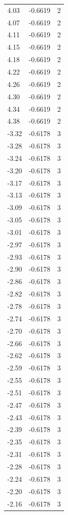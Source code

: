 \begin{longtable}{lrr}
  4.03 & -0.6619 & 2 \\
  4.07 & -0.6619 & 2 \\
  4.11 & -0.6619 & 2 \\
  4.15 & -0.6619 & 2 \\
  4.18 & -0.6619 & 2 \\
  4.22 & -0.6619 & 2 \\
  4.26 & -0.6619 & 2 \\
  4.30 & -0.6619 & 2 \\
  4.34 & -0.6619 & 2 \\
  4.38 & -0.6619 & 2 \\
  -3.32 & -0.6178 & 3 \\
  -3.28 & -0.6178 & 3 \\
  -3.24 & -0.6178 & 3 \\
  -3.20 & -0.6178 & 3 \\
  -3.17 & -0.6178 & 3 \\
  -3.13 & -0.6178 & 3 \\
  -3.09 & -0.6178 & 3 \\
  -3.05 & -0.6178 & 3 \\
  -3.01 & -0.6178 & 3 \\
  -2.97 & -0.6178 & 3 \\
  -2.93 & -0.6178 & 3 \\
  -2.90 & -0.6178 & 3 \\
  -2.86 & -0.6178 & 3 \\
  -2.82 & -0.6178 & 3 \\
  -2.78 & -0.6178 & 3 \\
  -2.74 & -0.6178 & 3 \\
  -2.70 & -0.6178 & 3 \\
  -2.66 & -0.6178 & 3 \\
  -2.62 & -0.6178 & 3 \\
  -2.59 & -0.6178 & 3 \\
  -2.55 & -0.6178 & 3 \\
  -2.51 & -0.6178 & 3 \\
  -2.47 & -0.6178 & 3 \\
  -2.43 & -0.6178 & 3 \\
  -2.39 & -0.6178 & 3 \\
  -2.35 & -0.6178 & 3 \\
  -2.31 & -0.6178 & 3 \\
  -2.28 & -0.6178 & 3 \\
  -2.24 & -0.6178 & 3 \\
  -2.20 & -0.6178 & 3 \\
  -2.16 & -0.6178 & 3 \\

\end{longtable}
